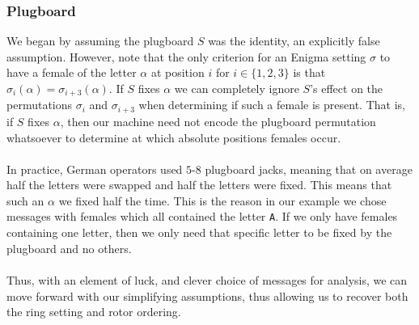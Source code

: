 \subsubsection{Plugboard}
We began by assuming the plugboard $S$ was the identity, an explicitly false assumption. However, note that the only criterion for an Enigma setting $\sigma$ to have a female of the letter $\alpha$ at position $i$ for $i \in \{1,2,3\}$ is that $\sigma_{i}(\alpha) = \sigma_{i+3}(\alpha)$. If $S$ fixes $\alpha$ we can completely ignore $S$'s effect on the permutations $\sigma_i$ and $\sigma_{i+3}$ when determining if such a female is present. That is, if $S$ fixes $\alpha$, then our machine need not encode the plugboard permutation whatsoever to determine at which absolute positions females occur.
\\\\In practice, German operators used $5$-$8$ plugboard jacks, meaning that on average half the letters were swapped and half the letters were fixed. This means that such an $\alpha$ we fixed half the time. This is the reason in our example we chose messages with females which all contained the letter \texttt{A}. If we only have females containing one letter, then we only need that specific letter to be fixed by the plugboard and no others.
\\\\Thus, with an element of luck, and clever choice of messages for analysis, we can move forward with our simplifying assumptions, thus allowing us to recover both the ring setting and rotor ordering.

